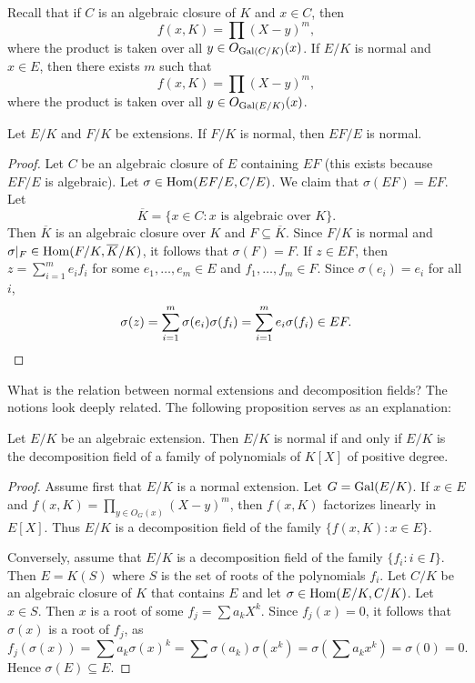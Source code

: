 Recall that if $C$ is an algebraic closure of $K$ and $x\in C$,
then 
\[
f(x,K)=\prod(X-y)^m,
\]
where the product is taken over all 
$y\in O_{\operatorname{Gal}(C/K)}(x)$. 
If $E/K$ is normal and $x\in E$, then there exists $m$ such that 
\[
f(x,K)=\prod(X-y)^m,
\]
where the product is taken over all 
$y\in O_{\operatorname{Gal}(E/K)}(x)$. 

\begin{proposition}
    Let $E/K$ and $F/K$ be extensions. If $F/K$ 
    is normal, then $EF/E$ is normal.
\end{proposition}

\begin{proof}
    Let $C$ be an algebraic closure of $E$ containing $EF$ (this exists because $EF/E$ is algebraic). 
    Let $\sigma\in\operatorname{Hom}(EF/E,C/E)$. We claim that $\sigma(EF)=EF$. Let 
    \[
    \overline{K}=\{x\in C:x\text{ is algebraic over $K$}\}.
    \]
    Then $\overline{K}$ is an algebraic closure over $K$ and $F\subseteq\overline{K}$. 
    Since $F/K$ is normal and $\sigma|_F\in\operatorname{Hom}(F/K,\overline{K}/K)$, 
    it follows that $\sigma(F)=F$. If $z\in EF$, then
    $z=\sum_{i=1}^m e_if_i$ for some $e_1,\dots,e_m\in E$ and 
    $f_1,\dots,f_m\in F$. Since $\sigma(e_i)=e_i$ for all $i$,  
    \[
    \sigma(z)=\sum_{i=1}^m\sigma(e_i)\sigma(f_i)=\sum_{i=1}^m e_i\sigma(f_i)\in EF.\qedhere 
    \]
\end{proof}

What is the relation between 
normal extensions and decomposition fields? The notions look
deeply related. The following proposition serves as an explanation: 

\begin{proposition}
\label{pro:normal<=>dec}
    Let $E/K$ be an algebraic extension. Then 
    $E/K$ is normal if and only if $E/K$ is the decomposition field
    of a family of polynomials of $K[X]$ of positive degree.
\end{proposition}

\begin{proof}
    Assume first that $E/K$ is a normal extension. 
    Let $G=\operatorname{Gal}(E/K)$.  If $x\in E$ and $f(x,K)=\prod_{y\in O_G(x)}(X-y)^m$, 
    then $f(x,K)$ factorizes linearly in $E[X]$. Thus 
    $E/K$ is a decomposition field of the family 
    $\{f(x,K):x\in E\}$. 
    
    Conversely, assume that $E/K$ is a decomposition field of the family 
    $\{f_i:i\in I\}$. Then $E=K(S)$ where $S$ is the set of roots
    of the polynomials $f_i$. Let $C/K$ be an algebraic closure
    of $K$ that contains $E$ and let $\sigma\in\operatorname{Hom}(E/K,C/K)$. Let $x\in S$. 
    Then $x$ is a root of some $f_j=\sum a_kX^k$. Since $f_j(x)=0$, 
    it follows that $\sigma(x)$ is a root of $f_j$, as 
    \[
    f_j(\sigma(x))=\sum a_k\sigma(x)^k
    =\sum\sigma(a_k)\sigma(x^k)
    =\sigma\left(\sum a_kx^k\right)=\sigma(0)=0.
    \]
    Hence $\sigma(E)\subseteq E$. 
\end{proof}

